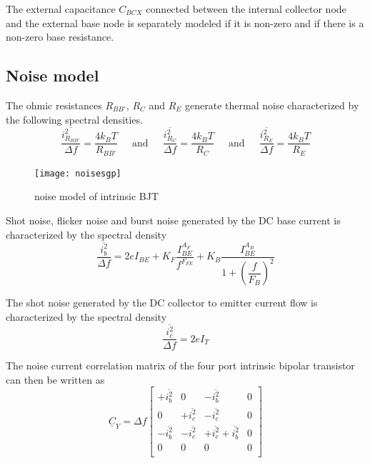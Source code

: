 \documentclass[10pt]{report}
\begin{document}
The external capacitance $C_{BCX}$ connected between the internal
collector node and the external base node is separately modeled if it
is non-zero and if there is a non-zero base resistance.

\subsection{Noise model}

The ohmic resistances $R_{BB'}$, $R_C$ and $R_E$ generate thermal
noise characterized by the following spectral densities.
\begin{equation}
\dfrac{\overline{i_{R_{BB'}}^2}}{\Delta f} = \dfrac{4 k_B T}{R_{BB'}}
\;\;\;\; \textrm{ and } \;\;\;\;
\dfrac{\overline{i_{R_C}^2}}{\Delta f} = \dfrac{4 k_B T}{R_C}
\;\;\;\; \textrm{ and } \;\;\;\;
\dfrac{\overline{i_{R_E}^2}}{\Delta f} = \dfrac{4 k_B T}{R_E}
\end{equation}

\begin{figure}[ht]
\begin{center}
\texttt{[image: noisesgp]}
\end{center}
\caption{noise model of intrinsic BJT}
\label{fig:noisesgp}
\end{figure}
\FloatBarrier

Shot noise, flicker noise and burst noise generated by the DC base
current is characterized by the spectral density
\begin{equation}
\dfrac{\overline{i_{b}^2}}{\Delta f} = 2e I_{BE} + K_F\dfrac{I_{BE}^{A_F}}{f^{F_{FE}}} + K_B\dfrac{I_{BE}^{A_B}}{1 + \left(\dfrac{f}{F_B}\right)^2}
\end{equation}

The shot noise generated by the DC collector to emitter current flow
is characterized by the spectral density
\begin{equation}
\dfrac{\overline{i_{c}^2}}{\Delta f} = 2e I_{T}
\end{equation}

The noise current correlation matrix of the four port intrinsic
bipolar transistor can then be written as
\begin{equation}
\underline{C}_Y = \Delta f
\begin{bmatrix}
+\overline{i_{b}^2} & 0 & -\overline{i_{b}^2} & 0\\
0 & +\overline{i_{c}^2} & -\overline{i_{c}^2} & 0\\
-\overline{i_{b}^2} & -\overline{i_{c}^2} & +\overline{i_{c}^2} +\overline{i_{b}^2} & 0\\
0 & 0 & 0 & 0\\
\end{bmatrix}
\end{equation}
\end{document}
